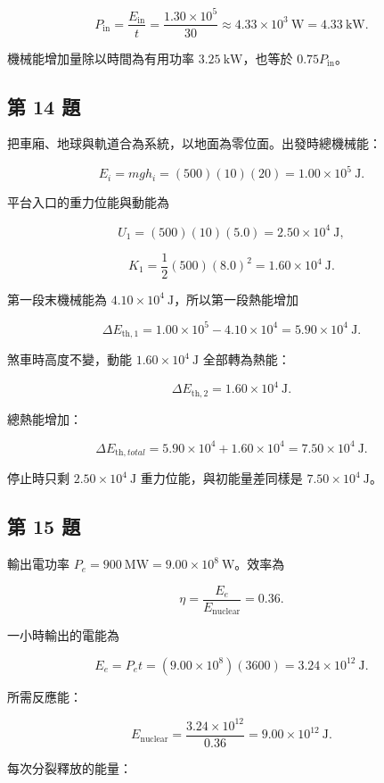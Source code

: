 \documentclass[11pt,a4paper]{article}
\begin{document}
\[
P_{\mathrm{in}}=\frac{E_{\mathrm{in}}}{t}
=\frac{1.30\times10^5}{30}
\approx4.33\times10^3\ \mathrm W=4.33\ \mathrm{kW}.
\]

機械能增加量除以時間為有用功率 \(3.25\ \mathrm{kW}\)，也等於 \(0.75P_{\mathrm{in}}\)。

\subsection{第 14 題}\label{ux7b2c-14-ux984c}

把車廂、地球與軌道合為系統，以地面為零位面。出發時總機械能：

\[
E_i=mgh_i=(500)(10)(20)=1.00\times10^5\ \mathrm J.
\]

平台入口的重力位能與動能為

\[
U_1=(500)(10)(5.0)=2.50\times10^4\ \mathrm J,
\]

\[
K_1=\frac12(500)(8.0)^2=1.60\times10^4\ \mathrm J.
\]

第一段末機械能為 \(4.10\times10^4\ \mathrm J\)，所以第一段熱能增加

\[
\Delta E_{{\mathrm{th}},1}=1.00\times10^5-4.10\times10^4
=5.90\times10^4\ \mathrm J.
\]

煞車時高度不變，動能 \(1.60\times10^4\ \mathrm J\) 全部轉為熱能：

\[
\Delta E_{{\mathrm{th}},2}=1.60\times10^4\ \mathrm J.
\]

總熱能增加：

\[
\Delta E_{\mathrm{th},total}=5.90\times10^4+1.60\times10^4
=7.50\times10^4\ \mathrm J.
\]

停止時只剩 \(2.50\times10^4\ \mathrm J\) 重力位能，與初能量差同樣是 \(7.50\times10^4\ \mathrm J\)。

\subsection{第 15 題}\label{ux7b2c-15-ux984c}

輸出電功率 \(P_e=900\ \mathrm{MW}=9.00\times10^8\ \mathrm W\)。效率為

\[
\eta=\frac{E_e}{E_{\mathrm{nuclear}}}=0.36.
\]

一小時輸出的電能為

\[
E_e=P_et=(9.00\times10^8)(3600)
=3.24\times10^{12}\ \mathrm J.
\]

所需反應能：

\[
E_{\mathrm{nuclear}}=\frac{3.24\times10^{12}}{0.36}
=9.00\times10^{12}\ \mathrm J.
\]

每次分裂釋放的能量：
\end{document}
